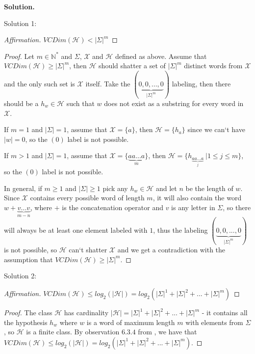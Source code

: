 \documentclass{article}
\newcommand{\<}{\langle}
\renewcommand{\>}{\rangle}
\theoremstyle{definition}
\begin{document}
\textbf{Solution.}

Solution 1:
\begin{proof}[Affirmation]\renewcommand{\qedsymbol}{}
$VCDim(\mathcal{H}) < |\Sigma|^m$
\end{proof}

\begin{proof}

Let $m\in\mathbb{N}^*$ and $\Sigma$, $\mathcal{X}$ and $\mathcal{H}$ defined as above. Assume that $VCDim(\mathcal{H})\geq|\Sigma|^m$, then $\mathcal{H}$ should shatter a set of $|\Sigma|^m$ distinct words from $\mathcal{X}$ and the only such set is $\mathcal{X}$ itself. Take the $(\underbrace{0, 0, ..., 0}_{|\Sigma|^m})$ labeling, then there should be a $h_w\in\mathcal{H}$ such that $w$ does not exist as a substring for every word in $\mathcal{X}$. 

If $m=1$ and $|\Sigma|=1$, assume that $\mathcal{X}=\{a\}$, then $\mathcal{H}=\{h_a\}$ since we can`t have $|w|=0$, so the $(0)$ label is not possible.

If $m>1$ and $|\Sigma|=1$, assume that $\mathcal{X}=\{\underbrace{aa...a}_m\}$, then $\mathcal{H}=\{h_{\underbrace{aa...a}_{j}}\ | 1 \leq j \leq m\}$, so the $(0)$ label is not possible.

In general, if $m\geq1$ and $|\Sigma|\geq1$ pick any $h_w \in \mathcal{H}$ and let $n$ be the length of $w$. Since $\mathcal{X}$ contains every possible word of length $m$, it will also contain the word $w+\underbrace{v...v}_{m-n}$, where $+$ is the concatenation operator and $v$ is any letter in $\Sigma$, so there will always be at least one element labeled with $1$, thus the labeling $(\underbrace{0, 0, ..., 0}_{|\Sigma|^m})$ is not possible, so $\mathcal{H}$ can`t shatter $\mathcal{X}$ and we get a contradiction with the assumption that $VCDim(\mathcal{H})\geq |\Sigma|^m$.
\end{proof}

Solution 2:
\begin{proof}[Affirmation]\renewcommand{\qedsymbol}{}
$VCDim(\mathcal{H}) \leq log_2(|\mathcal{H}|) = log_2(|\Sigma|^1+|\Sigma|^2+...+|\Sigma|^m)$
\end{proof}

\begin{proof}
The class $\mathcal{H}$ has cardinality $|\mathcal{H}| = |\Sigma|^1+|\Sigma|^2+...+|\Sigma|^m$ - it contains all the hypothesis $h_w$ where $w$ is a word of maximum length $m$ with elements from $\Sigma$, so $\mathcal{H}$ is a finite class. By observation $6.3.4$ from \cite{SS}, we have that $VCDim(\mathcal{H}) \leq log_2(|\mathcal{H}|) = log_2(|\Sigma|^1+|\Sigma|^2+...+|\Sigma|^m)$.
\end{proof}
\end{document}
